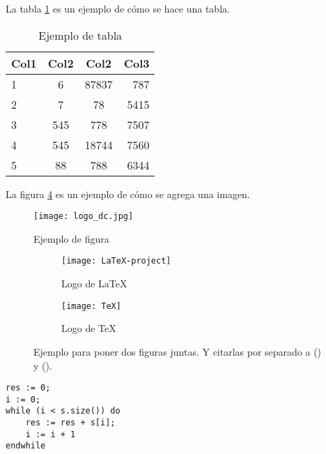 \documentclass[10pt,a4paper]{article}
\begin{document}
\vspace{0.3cm}

La tabla \ref{tab:ejemplo} es un ejemplo de cómo se hace una tabla.

\begin{table}[h!]
	\centering
	\begin{tabular}{||l c c r||} 
		\hline
		Col1 & Col2 & Col2 & Col3 \\ [0.5ex] 
		\hline\hline
		1 & 6 & 87837 & 787 \\ 
		2 & 7 & 78 & 5415 \\
		3 & 545 & 778 & 7507 \\
		4 & 545 & 18744 & 7560 \\
		5 & 88 & 788 & 6344 \\
		\hline
	\end{tabular}
	\caption{Ejemplo de tabla}
	\label{tab:ejemplo}
\end{table}


La figura \ref{fig:subfigs} es un ejemplo de cómo se agrega una imagen.

\begin{figure}[ht]
	\centering
	\texttt{[image: logo\_dc.jpg]}
	\caption{Ejemplo de figura}
	\label{fig:ejemplo}
\end{figure}

\begin{figure}[ht!]
	\begin{subfigure}{0.5\textwidth}
		\texttt{[image: LaTeX-project]} 
		\caption{Logo de LaTeX}
		\label{fig:subfig1}
	\end{subfigure}
	\begin{subfigure}{0.5\textwidth}
		\texttt{[image: TeX]}
		\caption{Logo de TeX}
		\label{fig:subfig2}
	\end{subfigure}
	\caption{Ejemplo para poner dos figuras juntas. Y citarlas por separado a () y ().}
	\label{fig:subfigs}
\end{figure}



	\begin{lstlisting}[caption={Ejemplo de código (usando los estilos de la cátedra, ver las macros para más detalles)},label=code:for]
res := 0;
i := 0;
while (i < s.size()) do
	res := res + s[i];
	i := i + 1
endwhile
	\end{lstlisting}
\end{document}
